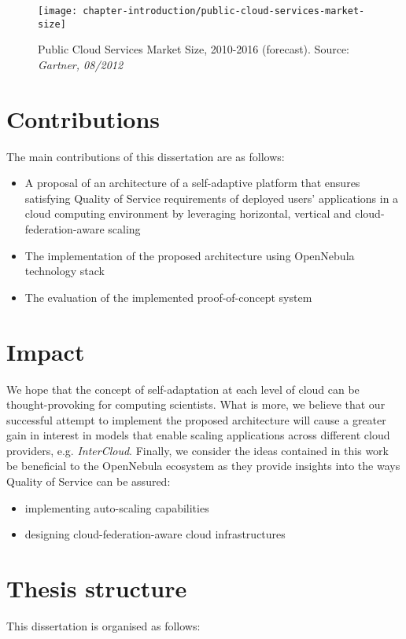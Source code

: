 \begin{figure}[!ht]
  \begin{center}
    \texttt{[image: chapter-introduction/public-cloud-services-market-size]}
  \end{center}
  \caption{Public Cloud Services Market Size, 2010-2016 (forecast). Source: \textit{Gartner, 08/2012}}
  \label{chapter-fig:public-cloud-services-market-size}
\end{figure}

\section{Contributions}
The main contributions of this dissertation are as follows:
\begin{itemize}
  \item A proposal of an architecture of a self-adaptive platform that ensures satisfying Quality of Service requirements of deployed users' applications in a cloud computing environment by leveraging horizontal, vertical and cloud-federation-aware scaling
  \item The implementation of the proposed architecture using OpenNebula technology stack
  \item The evaluation of the implemented proof-of-concept system
\end{itemize}

\section{Impact}
We hope that the concept of self-adaptation at each level of cloud can be thought-provoking for computing scientists.  What is more, we believe that our successful attempt to implement the proposed architecture will cause a greater gain in interest in models that enable scaling applications across different cloud providers, e.g. \emph{InterCloud}.
Finally, we consider the ideas contained in this work be beneficial to the OpenNebula ecosystem as they provide insights into the ways Quality of Service can be assured:

\begin{itemize}
  \item implementing auto-scaling capabilities
  \item designing cloud-federation-aware cloud infrastructures
\end{itemize}

\section{Thesis structure}
This dissertation is organised as follows:

